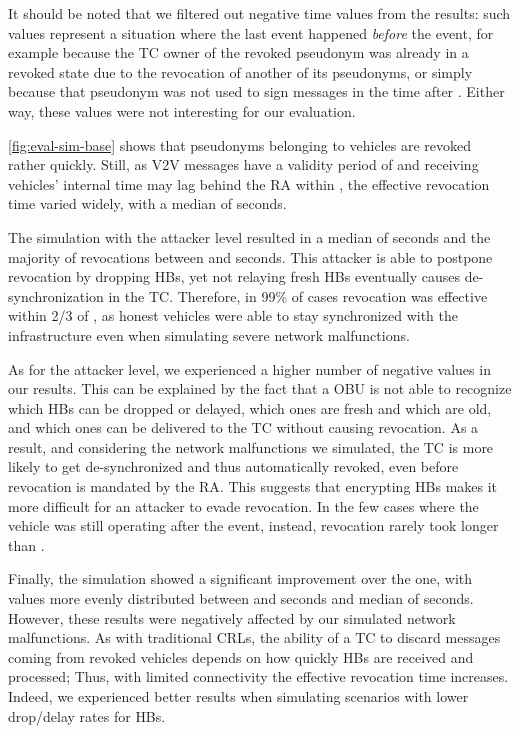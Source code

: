 It should be noted that we filtered out negative time values from the results:
such values represent a situation where the last \funcverify{} event happened
\emph{before} the \funcrevokedaa{} event, for example because the \ac{TC} owner
of the revoked pseudonym was already in a revoked state due to the revocation of
another of its pseudonyms, or simply because that pseudonym was not used to sign
messages in the time after \funcrevokedaa{}. Either way, these values were not
interesting for our evaluation.

\cref{fig:eval-sim-base} shows that pseudonyms belonging to \attackerhonest{}
vehicles are revoked rather quickly. Still, as \ac{V2V} messages have a validity
period of \paramtt{} and receiving vehicles' internal time may lag behind the RA
within \paramtt{}, the effective revocation time varied widely, with a median of
\simhonestmedian{} seconds.

The simulation with the \attackersmart{} attacker level resulted in a median of
\simsmartmedian{} seconds and the majority of revocations between \simsmartmin{}
and \simsmartmax{} seconds. %
This attacker is able to
postpone revocation by dropping \acp{HB}, yet %
not relaying
fresh \acp{HB} eventually causes de-synchronization in the \ac{TC}. Therefore,
in 99\% of cases revocation was effective within 2/3 of \paramteff{},
as honest vehicles were able to stay synchronized with the infrastructure
even when simulating severe network malfunctions.

As for the \attackerblind{} attacker level, we experienced a higher number of
negative values in our results. This can be explained by the fact that a
\attackerblind{} \ac{OBU} is not able to recognize which \acp{HB} can be dropped
or delayed, which ones are fresh and which are old, and which ones can be
delivered to the \ac{TC} without causing revocation. As a result, and
considering the network malfunctions we simulated, the \ac{TC} is more likely to
get de-synchronized and thus automatically revoked, even before revocation is
mandated by the \ac{RA}. This suggests that encrypting \acp{HB} makes it more
difficult for an attacker to evade revocation. In the few cases where the
vehicle was still operating after the \funcrevokedaa{} event, instead,
revocation rarely took longer than \paramtt{}.

Finally, the \attackersmartprl{} simulation showed a significant improvement
over the \attackersmart{} one, with values more evenly distributed between
\simsmartprlmin{} and \simsmartprlmax{} seconds and median of
\simsmartprlmedian{} seconds. However, these results were negatively affected by
our simulated network malfunctions. As with traditional \acp{CRL}, the ability
of a \ac{TC} to discard messages coming from revoked vehicles depends on how
quickly \acp{HB} are received and processed; Thus, with limited connectivity the
effective revocation time increases. Indeed, we experienced better results when
simulating scenarios with lower drop/delay rates for \acp{HB}.

